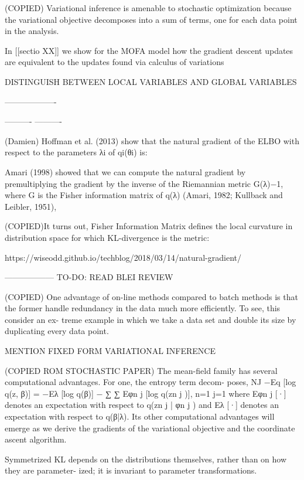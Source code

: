 (COPIED) Variational inference is amenable to stochastic optimization because the variational objective decomposes into a sum of terms, one for each data point in the analysis.



In [[sectio XX]] we show for the MOFA model how the gradient descent updates are equivalent to the updates found via calculus of variations


DISTINGUISH BETWEEN LOCAL VARIABLES AND GLOBAL VARIABLES



-------------------



----------
----------

(Damien) Hoffman et al. (2013) show that the natural gradient of the ELBO with respect to the parameters λi of qi(θi) is:

Amari (1998) showed that we can compute the natural gradient by premultiplying the gradient by the inverse of the Riemannian metric G(λ)−1,
where G is the Fisher information matrix of q(λ) (Amari, 1982; Kullback and Leibler, 1951),



(COPIED)It turns out, Fisher Information Matrix defines the local curvature in distribution space for which KL-divergence is the metric:

https://wiseodd.github.io/techblog/2018/03/14/natural-gradient/




















------------------
	TO-DO: READ BLEI REVIEW


	(COPIED) One advantage of on-line methods compared to batch methods is that the former handle redundancy in the data much more efficiently. To see, this consider an ex- treme example in which we take a data set and double its size by duplicating every data point.

	MENTION FIXED FORM VARIATIONAL INFERENCE


(COPIED ROM STOCHASTIC PAPER)
The mean-field family has several computational advantages. For one, the entropy term decom- poses,
NJ
−Eq [log q(z, β)] = −Eλ [log q(β)] − ∑ ∑ Eφn j [log q(zn j )],
n=1 j=1
where Eφn j [·] denotes an expectation with respect to q(zn j | φn j ) and Eλ [·] denotes an expectation with respect to q(β|λ). Its other computational advantages will emerge as we derive the gradients of the variational objective and the coordinate ascent algorithm.




Symmetrized KL depends on the distributions themselves, rather than on how they are parameter- ized; it is invariant to parameter transformations.

